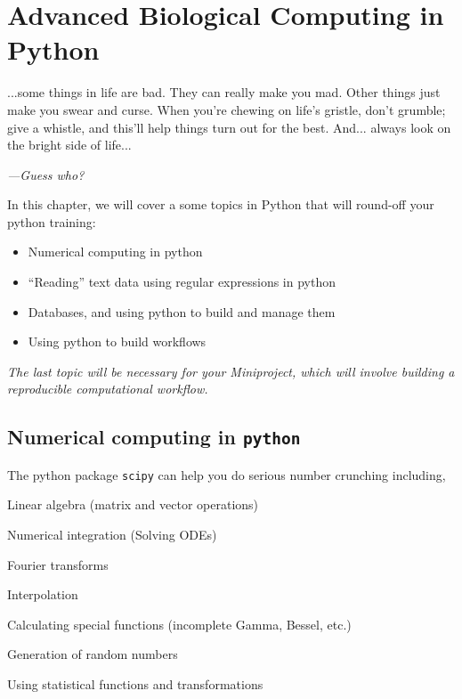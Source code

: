 \chapter{Advanced Biological Computing in Python}
\label{chap:pythonII}

\epigraph{...some things in life are bad. They can really make you mad. 
Other things just make you swear and curse. When you're chewing on 
life's gristle, don't grumble; give a whistle, and this'll help things 
turn out for the  best. And... always look on the bright side of 
life...}{\textit{---Guess who?}}

In this chapter, we will cover a some topics in Python that will 
round-off your python training:
\begin{itemize}
	\item Numerical computing in python 
	\item ``Reading'' text data using regular expressions in python
	\item Databases, and using python to build and manage them
	\item Using python to build workflows
\end{itemize}  
{\it The last topic will be necessary for your Miniproject, which will 
involve building a reproducible computational workflow.  }

\section{Numerical computing in {\tt python}}

The python package {\tt scipy} can help you do serious number crunching 
including,
	\begin{compactitem}
		\item Linear algebra (matrix and vector operations)
		\item Numerical integration (Solving ODEs)
		\item Fourier transforms
		\item Interpolation
		\item Calculating special functions (incomplete Gamma, Bessel, etc.)
		\item Generation of random numbers
		\item Using statistical functions and transformations
	\end{compactitem}
	
